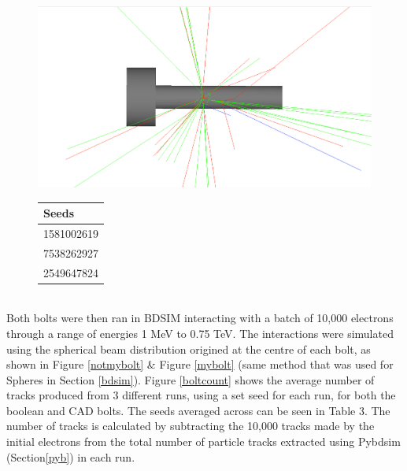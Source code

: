 \documentclass[12pt,a4paper]{article}
\begin{document}
\begin{figure}[h!]
\centering
\begin{minipage}{.5\textwidth}
  \centering
  \includegraphics[height=.5\linewidth]{Images//CAD_Screw//skinnybolt.png}
  \label{mybolt2}
\end{minipage}%
\begin{minipage}{.5\textwidth}
\centering
\begin{tabular}{|l|}
\hline
Seeds \\ \hline
1581002619\\ \hline
7538262927\\ \hline
2549647824\\ \hline
\end{tabular}
\vspace{1.6cm}
\label{tabbb}
\end{minipage}%
\end{figure}
\\
\noindent Both bolts were then ran in BDSIM interacting with a batch of 10,000 electrons through a range of energies 1 MeV to 0.75 TeV. The interactions were simulated using the spherical beam distribution origined at the centre of each bolt, as shown in Figure \ref{notmybolt} \& Figure \ref{mybolt} (same method that was used for Spheres in Section \ref{bdsim}). Figure \ref{boltcount} shows the average number of tracks produced from 3 different runs, using a set seed for each run, for both the boolean and CAD bolts. The seeds averaged across can be seen in Table 3. The number of tracks is calculated by subtracting the 10,000 tracks made by the initial electrons from the total number of particle tracks extracted using Pybdsim (Section\ref{pyb}) in each run.
\end{document}
